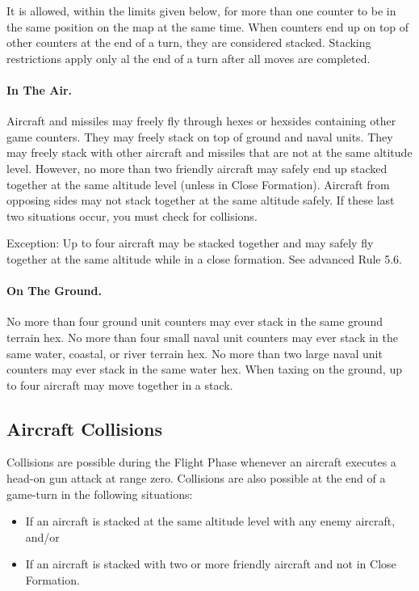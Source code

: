 It is allowed, within the limits given below, for more than one counter to be in the same position on the map at the same time. When counters end up on top of other counters at the end of a turn, they are considered stacked. Stacking restrictions apply only al the end of a turn after all moves are completed.

\paragraph{In The Air.} Aircraft and missiles may freely fly through hexes or hexsides containing other game counters. They may freely stack on top of ground and naval units. They may freely stack with other aircraft and missiles that are not at the same altitude level. However, no more than two friendly aircraft may safely end up stacked together at the same altitude level (unless in Close Formation). Aircraft from opposing sides may not stack together at the same altitude safely. If these last two situations occur, you must check for collisions.

Exception: Up to four aircraft may be stacked together and may safely fly together at the same altitude while in a close formation. See advanced Rule 5.6.

\paragraph{On The Ground.} No more than four ground unit counters may ever stack in the same ground terrain hex. No more than four small naval unit counters may ever stack in the same water, coastal, or river terrain hex. No more than two large naval unit counters may ever stack in the same water hex. When taxing on the ground, up to four aircraft may move together in a stack.

\subsection{Aircraft Collisions}

Collisions are possible during the Flight Phase whenever an aircraft executes a head-on gun attack at range zero. Collisions are also possible at the end of a game-turn in the following situations:

\begin{itemize}
    \item If an aircraft is stacked at the same altitude level with any enemy aircraft, and/or
    \item If an aircraft is stacked with two or more friendly aircraft and not in Close Formation.
\end{itemize}

